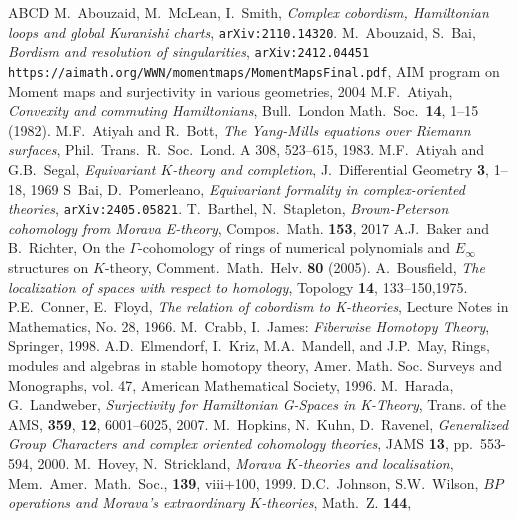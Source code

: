\documentclass[11pt, reqno]{amsart}
\theoremstyle{plain}
\theoremstyle{definition}
\begin{document}
\begin{thebibliography}{ABCD}
M.~Abouzaid,  M.~McLean,  I.~Smith,  \emph{Complex cobordism, Hamiltonian loops and global Kuranishi charts},  
 \texttt{arXiv:2110.14320}. 
M.~Abouzaid, S.~Bai, \emph{Bordism and resolution of singularities}, \texttt{arXiv:2412.04451} 
\texttt{https://aimath.org/WWN/momentmaps/MomentMapsFinal.pdf}, AIM program on 
{Moment maps and surjectivity in various geometries}, 2004
M.F.~Atiyah, \emph{Convexity and commuting Hamiltonians},  Bull.~London Math.~Soc.~\textbf{14}, 1--15 (1982). 
M.F.~Atiyah and R.~Bott, \emph{The Yang-Mills equations over Riemann surfaces}, Phil.~Trans.~R.~Soc.~Lond.
A 308, 523--615,  1983.
M.F.~Atiyah and G.B.~Segal, \emph{Equivariant $K$-theory and completion}, J.~Differential Geometry \textbf{3}, 
	1--18, 1969
S~Bai, D.~Pomerleano,  \emph{Equivariant formality in complex-oriented theories},  \texttt{arXiv:2405.05821}.  
T.~Barthel,  N.~Stapleton, \emph{Brown-Peterson cohomology from Morava E-theory},  Compos.~Math. \textbf{153}, 2017
A.J.~Baker and B.~Richter,  On the $\Gamma$-cohomology of rings of numerical polynomials and $E_\infty$
 structures on $K$-theory,  Comment.~Math.~Helv. \textbf{80} (2005).
A.~Bousfield,  \emph{The localization of spaces with respect to homology},  Topology \textbf{14}, 133--150,1975. 
P.E.~Conner,  E.~Floyd,  \emph{The relation of cobordism to K-theories}, Lecture Notes in Mathematics, No. 28, 1966. 
M.~Crabb, I.~James: \emph{Fiberwise Homotopy Theory}, Springer, 1998.
A.D.~Elmendorf, I.~Kriz, M.A.~Mandell, and J.P.~May,  Rings, modules and algebras in stable homotopy theory, 
Amer. Math. Soc. Surveys and Monographs, vol. 47,  American Mathematical Society, 1996.
M.~Harada,  G.~Landweber, \emph{Surjectivity for Hamiltonian G-Spaces in K-Theory}, Trans. of the AMS, \textbf{359}, 
\textbf{12}, 6001--6025, 2007.
M.~Hopkins,  N.~Kuhn,  D.~Ravenel,  \emph{Generalized Group Characters and complex oriented cohomology theories},  
JAMS \textbf{13},   pp.~553-594,  2000.  
M.~Hovey,  N.~Strickland,  \emph{Morava {$K$}-theories and localisation}, Mem.~Amer.~Math.~Soc., \textbf{139},
viii+100, 1999.
D.C.~Johnson, S.W.~Wilson, \emph{$BP$ operations and Morava's extraordinary $K$-theories}, Math.~Z. \textbf{144}, 

\end{thebibliography}
\end{document}
